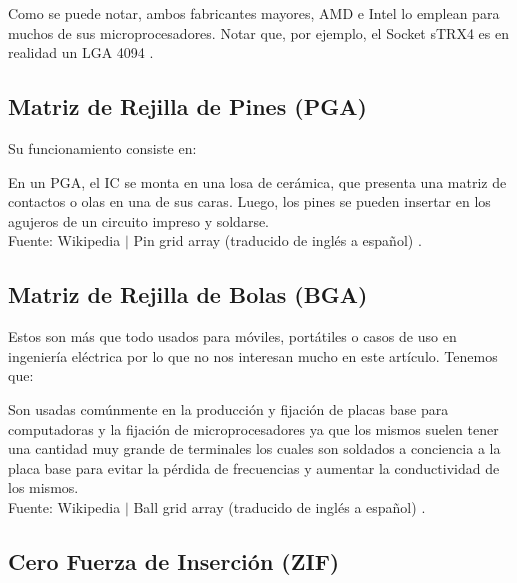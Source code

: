 \documentclass[conference]{IEEEtran}
\begin{document}
    \bigbreak

    Como se puede notar, ambos fabricantes mayores, AMD e Intel lo emplean
    para muchos de sus microprocesadores. Notar que, por ejemplo, el Socket
    sTRX4 es en realidad un LGA 4094 \cite{wikipedia-lga-2021D}.

    \subsection{Matriz de Rejilla de Pines (PGA)}

    Su funcionamiento consiste en:

    \bigbreak

    \begin{displayquote}
        En un PGA, el IC se monta en una losa de cerámica, que presenta una
        matriz de contactos o olas en una de sus caras. Luego, los pines se
        pueden insertar en los agujeros de un circuito impreso y soldarse.\\
        \small
        Fuente: Wikipedia $\mid$ Pin grid array (traducido de inglés a
        español) \cite{wikipedia-pga-2021C}.
    \end{displayquote}

    \subsection{Matriz de Rejilla de Bolas (BGA)}

    Estos son más que todo usados para móviles, portátiles o casos de uso en
    ingeniería eléctrica \cite{wikipedia-bga-2021B} por lo que no nos
    interesan mucho en este artículo. Tenemos que:

    \begin{displayquote}
        Son usadas comúnmente en la producción y fijación de placas base para
        computadoras y la fijación de microprocesadores ya que los mismos
        suelen tener una cantidad muy grande de terminales los cuales son
        soldados a conciencia a la placa base para evitar la pérdida de
        frecuencias y aumentar la conductividad de los mismos.\\
        \small
        Fuente: Wikipedia $\mid$ Ball grid array (traducido de inglés a
        español) \cite{wikipedia-bga-2021B}.
    \end{displayquote}

    \subsection{Cero Fuerza de Inserción (ZIF)}
\end{document}
